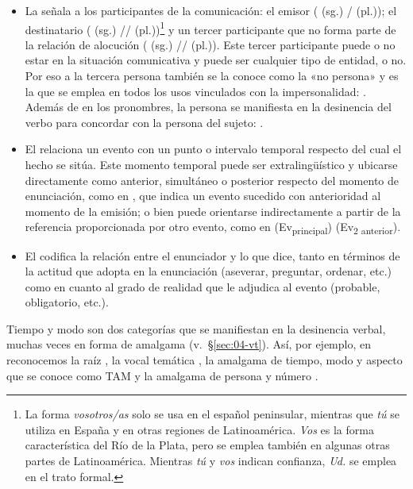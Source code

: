 \begin{itemize}
  \item La  señala a los participantes de la comunicación: el
        emisor ( (sg.) /  (pl.)); el destinatario
        ( (sg.) // 
        (pl.))\footnote{La forma \textit{vosotros/as} solo se usa en el español
        peninsular, mientras que \textit{tú} se utiliza en España y en otras
        regiones de Latinoamérica. \textit{Vos} es la forma característica del
        Río de la Plata, pero se emplea también en algunas otras partes de
        Latinoamérica. Mientras \textit{tú} y \textit{vos} indican confianza,
        \textit{Ud.} se emplea en el trato formal.} y un tercer participante que
        no forma parte de la relación de alocución ( (sg.) //
         (pl.)). Este tercer participante puede o no estar
        en la situación comunicativa y puede ser cualquier tipo de entidad,
         o no. Por eso a la tercera persona también se la conoce
        como la «no persona» y es la que se emplea en todos los usos vinculados
        con la impersonalidad: . Además de en los pronombres, la persona se manifiesta en la
        desinencia del verbo para concordar con la persona del sujeto:
        .
  \item El  relaciona un evento con un punto o intervalo
        temporal respecto del cual el hecho se sitúa. Este momento temporal
        puede ser extralingüístico y ubicarse directamente como anterior,
        simultáneo o posterior respecto del momento de enunciación, como en
        , que indica un evento sucedido con anterioridad
        al momento de la emisión; o bien puede orientarse indirectamente a partir
        de la referencia proporcionada por otro evento, como en 
        (Ev\textsubscript{principal}) 
        (Ev\textsubscript{2 anterior}).
  \item El  codifica la relación entre el enunciador y lo que
        dice, tanto en términos de la actitud que adopta en la enunciación
        (aseverar, preguntar, ordenar, etc.) como en cuanto al grado de realidad
        que le adjudica al evento (probable, obligatorio, etc.).
\end{itemize}

Tiempo y modo son dos categorías que se manifiestan en la desinencia verbal,
muchas veces en forma de amalgama (v.~§\ref{sec:04-vt}). Así, por ejemplo, en
 reconocemos la raíz , la vocal temática
, la amalgama de tiempo, modo y aspecto que se conoce como TAM y la
amalgama de persona y número .

